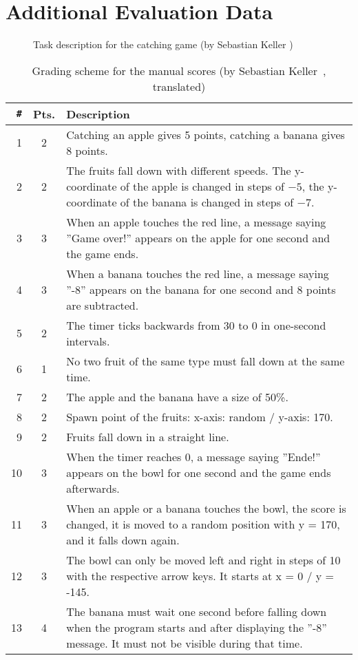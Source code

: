 \chapter{Additional Evaluation Data}
\label{cha:additional_evaluation_data}

\begin{figure}[htpb]
    \centering
    \caption{Task description for the catching game (by Sebastian Keller \cite{keller})}
    \label{fig:catching_game_task_description}
\end{figure}

\begin{table}[htpb]
    \centering
    \footnotesize
    \begin{tabular}{rcp{}}
        \toprule
        \texttt{\#} & Pts. & Description \\
        \midrule
         1 & 2 & Catching an apple gives 5 points, catching a banana gives 8 points. \\
         2 & 2 & The fruits fall down with different speeds. The y-coordinate of the apple is changed in steps of $-5$, the y-coordinate of the banana is changed in steps of $-7$. \\
         3 & 3 & When an apple touches the red line, a message saying ''Game over!'' appears on the apple for one second and the game ends. \\
         4 & 3 & When a banana touches the red line, a message saying ''-8'' appears on the banana for one second and 8 points are subtracted. \\
         5 & 2 & The timer ticks backwards from $30$ to $0$ in one-second intervals. \\
         6 & 1 & No two fruit of the same type must fall down at the same time. \\
         7 & 2 & The apple and the banana have a size of 50\%. \\
         8 & 2 & Spawn point of the fruits: x-axis: random / y-axis: 170. \\
         9 & 2 & Fruits fall down in a straight line. \\
        10 & 3 & When the timer reaches 0, a message saying ''Ende!'' appears on the bowl for one second and the game ends afterwards. \\
        11 & 3 & When an apple or a banana touches the bowl, the score is changed, it is moved to a random position with y = 170, and it falls down again. \\
        12 & 3 & The bowl can only be moved left and right in steps of 10 with the respective arrow keys. It starts at x = 0 / y = -145. \\
        13 & 4 & The banana must wait one second before falling down when the program starts and after displaying the ''-8'' message. It must not be visible during that time. \\
        \bottomrule
    \end{tabular}
    \caption{Grading scheme for the manual scores (by Sebastian Keller~\cite{keller}, translated)}
    \label{tab:manual_grading_scheme}
\end{table}

